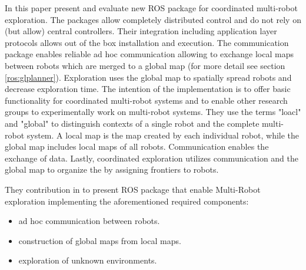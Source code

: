 In this paper \cite{cooros} present and evaluate new ROS package for coordinated 
multi-robot exploration. The packages allow completely distributed control and do 
not rely on (but allow) central controllers.
Their integration including application layer
protocols allows out of the box installation and execution. The
communication package enables reliable ad hoc communication
allowing to exchange local maps between robots which are
merged to a global map (for more detail see section \ref{ros:glplanner}).
Exploration uses the global map
to spatially spread robots and decrease exploration time. The
intention of the implementation is to offer basic functionality for
coordinated multi-robot systems and to enable other research
groups to experimentally work on multi-robot systems.
They use the terms "loacl" and "global" to distinguish contexts of a single robot and
the complete multi-robot system. 
A local map is the map created by each individual robot, while the global map includes
local maps of all robots. Communication enables the exchange of data. Lastly, coordinated
exploration utilizes communication and the global map to organize the \mrs by assigning
frontiers to robots. 

They contribution in to present ROS package that enable Multi-Robot exploration implementing 
the aforementioned required components:
\begin{itemize}
    \item ad hoc communication between robots.
    \item construction of global maps from local maps.
    \item exploration of unknown environments.
\end{itemize}


